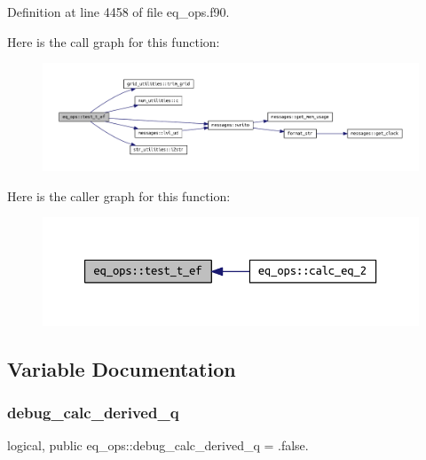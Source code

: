 Definition at line 4458 of file eq\+\_\+ops.\+f90.

Here is the call graph for this function\+:
\nopagebreak
\begin{figure}[H]
\begin{center}
\leavevmode
\includegraphics[width=350pt]{namespaceeq__ops_a1f5049c3e309fa23ee46fd116c9344f1_cgraph}
\end{center}
\end{figure}
Here is the caller graph for this function\+:
\nopagebreak
\begin{figure}[H]
\begin{center}
\leavevmode
\includegraphics[width=350pt]{namespaceeq__ops_a1f5049c3e309fa23ee46fd116c9344f1_icgraph}
\end{center}
\end{figure}


\subsection{Variable Documentation}
\mbox{\label{namespaceeq__ops_a1b6609a8d8b427d9133bf323e732f209}} 
\subsubsection{\texorpdfstring{debug\+\_\+calc\+\_\+derived\+\_\+q}{debug\_calc\_derived\_q}}
{\footnotesize\ttfamily logical, public eq\+\_\+ops\+::debug\+\_\+calc\+\_\+derived\+\_\+q = .false.}



